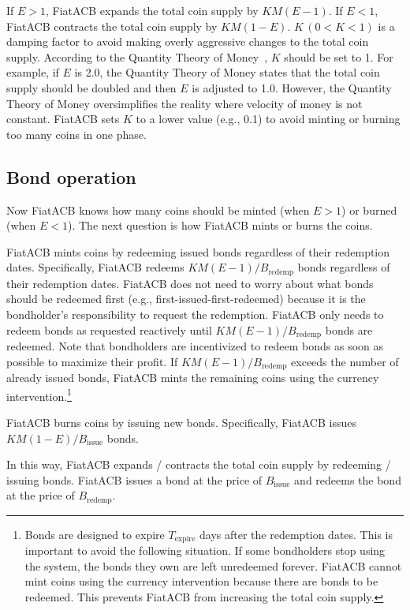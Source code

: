 \documentclass[dvipdfmx,a4paper]{article}
\begin{document}
If $E>1$, FiatACB expands the total coin supply by $KM(E-1)$. If $E<1$, FiatACB contracts the total coin supply by $KM(1-E)$. $K\,(0<K<1)$ is a damping factor to avoid making overly aggressive changes to the total coin supply. According to the Quantity Theory of Money~\cite{mankiwmacro}, $K$ should be set to 1. For example, if $E$ is 2.0, the Quantity Theory of Money states that the total coin supply should be doubled and then $E$ is adjusted to 1.0. However, the Quantity Theory of Money oversimplifies the reality where velocity of money is not constant. FiatACB sets $K$ to a lower value (e.g., 0.1) to avoid minting or burning too many coins in one phase.

\subsection{Bond operation}

Now FiatACB knows how many coins should be minted (when $E>1$) or burned (when $E<1$). The next question is how FiatACB mints or burns the coins.

FiatACB mints coins by redeeming issued bonds regardless of their redemption dates. Specifically, FiatACB redeems $KM(E-1)/B_{\mathrm{redemp}}$ bonds regardless of their redemption dates. FiatACB does not need to worry about what bonds should be redeemed first (e.g., first-issued-first-redeemed) because it is the bondholder's responsibility to request the redemption. FiatACB only needs to redeem bonds as requested reactively until $KM(E-1)/B_{\mathrm{redemp}}$ bonds are redeemed. Note that bondholders are incentivized to redeem bonds as soon as possible to maximize their profit. If $KM(E-1)/B_{\mathrm{redemp}}$ exceeds the number of already issued bonds, FiatACB mints the remaining coins using the currency intervention.\footnote{Bonds are designed to expire $T_{\mathrm{expire}}$ days after the redemption dates. This is important to avoid the following situation. If some bondholders stop using the system, the bonds they own are left unredeemed forever. FiatACB cannot mint coins using the currency intervention because there are bonds to be redeemed. This prevents FiatACB from increasing the total coin supply.}

FiatACB burns coins by issuing new bonds. Specifically, FiatACB issues $KM(1-E)/B_{\mathrm{issue}}$ bonds.

In this way, FiatACB expands / contracts the total coin supply by redeeming / issuing bonds. FiatACB issues a bond at the price of $B_{\mathrm{issue}}$ and redeems the bond at the price of $B_{\mathrm{redemp}}$.
\end{document}
